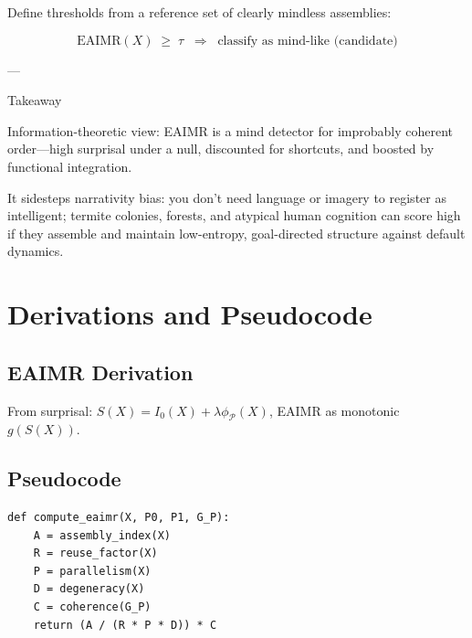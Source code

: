 \documentclass{article}
\begin{document}
Define thresholds from a reference set of clearly mindless assemblies:

\[\text{EAIMR}(X) \;\ge\; \tau \;\;\Rightarrow\;\; \text{classify as mind-like (candidate)}\]

---

Takeaway

Information-theoretic view: EAIMR is a mind detector for improbably coherent order—high surprisal under a null, discounted for shortcuts, and boosted by functional integration.

It sidesteps narrativity bias: you don’t need language or imagery to register as intelligent; termite colonies, forests, and atypical human cognition can score high if they assemble and maintain low-entropy, goal-directed structure against default dynamics.

\section{Derivations and Pseudocode}
\label{app:derivations}

\subsection{EAIMR Derivation}
From surprisal: \(S(X) = I_0(X) + \lambda \phi_{\mathcal{P}}(X)\), EAIMR as monotonic \(g(S(X))\).

\subsection{Pseudocode}
\begin{verbatim}
def compute_eaimr(X, P0, P1, G_P):
    A = assembly_index(X)
    R = reuse_factor(X)
    P = parallelism(X)
    D = degeneracy(X)
    C = coherence(G_P)
    return (A / (R * P * D)) * C
\end{verbatim}



\end{document}
